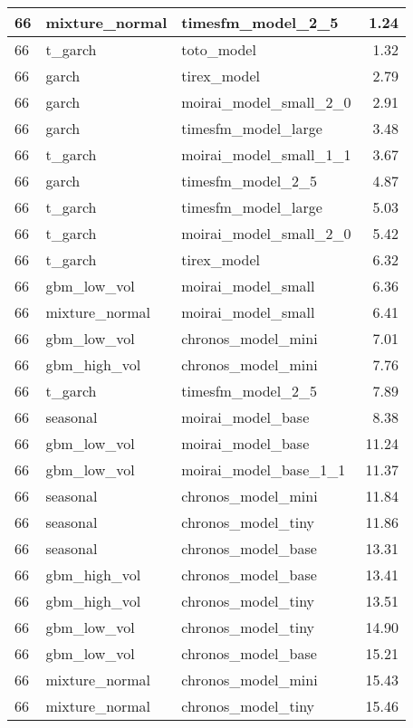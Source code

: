 {\begin{tabular}{lllr}
\midrule
66 & mixture\_normal & timesfm\_model\_2\_5 & 1.24 \\
\midrule
66 & t\_garch & toto\_model & 1.32 \\
\midrule
66 & garch & tirex\_model & 2.79 \\
\midrule
66 & garch & moirai\_model\_small\_2\_0 & 2.91 \\
\midrule
66 & garch & timesfm\_model\_large & 3.48 \\
\midrule
66 & t\_garch & moirai\_model\_small\_1\_1 & 3.67 \\
\midrule
66 & garch & timesfm\_model\_2\_5 & 4.87 \\
\midrule
66 & t\_garch & timesfm\_model\_large & 5.03 \\
\midrule
66 & t\_garch & moirai\_model\_small\_2\_0 & 5.42 \\
\midrule
66 & t\_garch & tirex\_model & 6.32 \\
\midrule
66 & gbm\_low\_vol & moirai\_model\_small & 6.36 \\
\midrule
66 & mixture\_normal & moirai\_model\_small & 6.41 \\
\midrule
66 & gbm\_low\_vol & chronos\_model\_mini & 7.01 \\
\midrule
66 & gbm\_high\_vol & chronos\_model\_mini & 7.76 \\
\midrule
66 & t\_garch & timesfm\_model\_2\_5 & 7.89 \\
\midrule
66 & seasonal & moirai\_model\_base & 8.38 \\
\midrule
66 & gbm\_low\_vol & moirai\_model\_base & 11.24 \\
\midrule
66 & gbm\_low\_vol & moirai\_model\_base\_1\_1 & 11.37 \\
\midrule
66 & seasonal & chronos\_model\_mini & 11.84 \\
\midrule
66 & seasonal & chronos\_model\_tiny & 11.86 \\
\midrule
66 & seasonal & chronos\_model\_base & 13.31 \\
\midrule
66 & gbm\_high\_vol & chronos\_model\_base & 13.41 \\
\midrule
66 & gbm\_high\_vol & chronos\_model\_tiny & 13.51 \\
\midrule
66 & gbm\_low\_vol & chronos\_model\_tiny & 14.90 \\
\midrule
66 & gbm\_low\_vol & chronos\_model\_base & 15.21 \\
\midrule
66 & mixture\_normal & chronos\_model\_mini & 15.43 \\
\midrule
66 & mixture\_normal & chronos\_model\_tiny & 15.46 \\

\end{tabular}}
